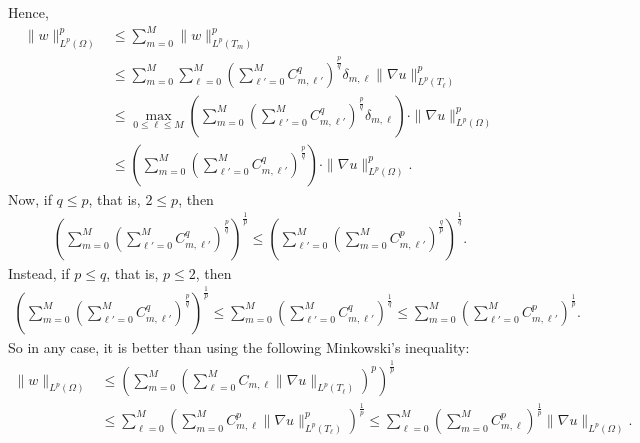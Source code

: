 \documentclass[10pt,a4paper]{article}
\begin{document}
\begin{remark}
    \color{green}Hence, 
    \begin{align}
        \| w \|_{L^{p}(\Omega)}^{p}
        &
        \leq 
        \sum_{m=0}^{M}
        \| w \|_{L^{p}(T_{m})}^{p}
        \\&
        \leq 
        \sum_{m=0}^{M}
        \sum_{\ell=0}^{M} 
        \left( \sum_{\ell'=0}^{M} C_{m,\ell'}^{q} \right)^{\frac p q}
        \delta_{m,\ell} \| \nabla u \|_{L^{p}(T_{\ell})}^{p} 
        \\&
        \leq 
        \max_{0 \leq \ell \leq M} \left(
            \sum_{m=0}^{M}
            \left( \sum_{\ell'=0}^{M} C_{m,\ell'}^{q} \right)^{\frac p q}
            \delta_{m,\ell} 
        \right)
        \cdot 
        \| \nabla u \|_{L^{p}(\Omega)}^{p} 
        \\&
        \leq 
        \left(
            \sum_{m=0}^{M}
            \left( \sum_{\ell'=0}^{M} C_{m,\ell'}^{q} \right)^{\frac p q}
        \right)
        \cdot 
        \| \nabla u \|_{L^{p}(\Omega)}^{p} 
        .
    \end{align}
    Now, if $q \leq p$, that is, $2 \leq p$, then 
    \begin{align}
        \left(
            \sum_{m=0}^{M}
            \left( \sum_{\ell'=0}^{M} C_{m,\ell'}^{q} \right)^{\frac p q}
        \right)^{\frac 1 p}
        \leq 
        \left(
            \sum_{\ell'=0}^{M}
            \left( \sum_{m=0}^{M} C_{m,\ell'}^{p} \right)^{\frac q p}
        \right)^{\frac 1 q}
        .
    \end{align}
    Instead, if $p \leq q$, that is, $p \leq 2$, then 
    \begin{align}
        \left(
            \sum_{m=0}^{M}
            \left( \sum_{\ell'=0}^{M} C_{m,\ell'}^{q} \right)^{\frac p q}
        \right)^{\frac 1 p}
        \leq 
        \sum_{m=0}^{M}
        \left( \sum_{\ell'=0}^{M} C_{m,\ell'}^{q} \right)^{\frac 1 q}
        \leq 
        \sum_{m=0}^{M}
        \left( \sum_{\ell'=0}^{M} C_{m,\ell'}^{p} \right)^{\frac 1 p}
        .
    \end{align}
    So in any case, it is better than using the following Minkowski's inequality: 
    \begin{align}
        \| w \|_{L^{p}(\Omega)}
        &
        \leq 
        \left( \sum_{m=0}^{M} \left( \sum_{\ell=0}^{M} C_{m,\ell} \| \nabla u \|_{L^{p}(T_{\ell})} \right)^{p} \right)^{\frac 1 p}
        \\&
        \leq 
        \sum_{\ell=0}^{M}
        \left( \sum_{m=0}^{M} C_{m,\ell}^{p} \| \nabla u \|_{L^{p}(T_{\ell})}^{p} \right)^{\frac 1 p}
        \leq 
        \sum_{\ell=0}^{M}
        \left( \sum_{m=0}^{M} C_{m,\ell}^{p} \right)^{\frac 1 p}
        \| \nabla u \|_{L^{p}(\Omega)}
        .
    \end{align}
\end{remark}
\end{document}
